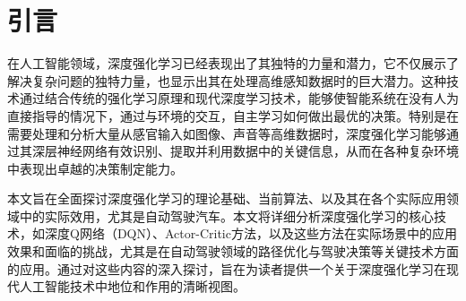 \section{引言}\label{sec:introduction}

在人工智能领域，深度强化学习已经表现出了其独特的力量和潜力，它不仅展示了解决复杂问题的独特力量，也显示出其在处理高维感知数据时的巨大潜力。这种技术通过结合传统的强化学习原理和现代深度学习技术，能够使智能系统在没有人为直接指导的情况下，通过与环境的交互，自主学习如何做出最优的决策。特别是在需要处理和分析大量从感官输入如图像、声音等高维数据时，深度强化学习能够通过其深层神经网络有效识别、提取并利用数据中的关键信息，从而在各种复杂环境中表现出卓越的决策制定能力。

本文旨在全面探讨深度强化学习的理论基础、当前算法、以及其在各个实际应用领域中的实际效用，尤其是自动驾驶汽车。本文将详细分析深度强化学习的核心技术，如深度Q网络（DQN）、Actor-Critic方法，以及这些方法在实际场景中的应用效果和面临的挑战，尤其是在自动驾驶领域的路径优化与驾驶决策等关键技术方面的应用。通过对这些内容的深入探讨，旨在为读者提供一个关于深度强化学习在现代人工智能技术中地位和作用的清晰视图。
